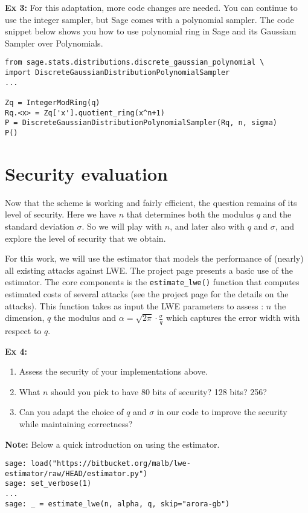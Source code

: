 \documentclass[10pt,a4paper,nobib]{tufte-handout}
\begin{document}
\textbf{Ex 3:} For this adaptation, more code changes are needed. You can continue to use the integer sampler, but Sage comes with a polynomial sampler. The code snippet below shows you how to use polynomial ring in Sage and its Gaussiam Sampler over Polynomials.
\lstset{language=sage,label= ,caption= ,captionpos=b,numbers=none}
\begin{lstlisting}
from sage.stats.distributions.discrete_gaussian_polynomial \
import DiscreteGaussianDistributionPolynomialSampler
...

Zq = IntegerModRing(q)
Rq.<x> = Zq['x'].quotient_ring(x^n+1)
P = DiscreteGaussianDistributionPolynomialSampler(Rq, n, sigma)
P()
\end{lstlisting}


\section{Security evaluation}

Now that the scheme is working and fairly efficient, the question remains of its level of security. Here we have $n$ that determines both the modulus $q$ and the standard deviation $\sigma$. So we will play with $n$, and later also with $q$ and $\sigma$, and explore the level of security that we obtain.

For this work, we will use the estimator that models the performance of (nearly) all existing attacks against LWE\@. The project page presents a basic use of the estimator. The core components is the \texttt{estimate\_lwe()} function that computes estimated costs of several attacks (see the project page for the details on the attacks). This function takes as input the LWE parameters to assess : $n$ the dimension, $q$ the modulus and $\alpha = \sqrt{2\pi}\cdot \frac{\sigma}{q}$ which captures the error width with respect to $q$. 

\textbf{Ex 4:}
\begin{enumerate}
  \item Assess the security of your implementations above.
  \item What $n$ should you pick to have 80 bits of security? 128 bits? 256?
  \item Can you adapt the choice of $q$ and $\sigma$ in our code to improve the security while maintaining correctness?
\end{enumerate}

\textbf{Note:} Below a quick introduction on using the estimator.
\lstset{language=sage,label= ,caption= ,captionpos=b,numbers=none}
\begin{lstlisting}
sage: load("https://bitbucket.org/malb/lwe-estimator/raw/HEAD/estimator.py")
sage: set_verbose(1)
...
sage: _ = estimate_lwe(n, alpha, q, skip="arora-gb")
\end{lstlisting}
\end{document}
